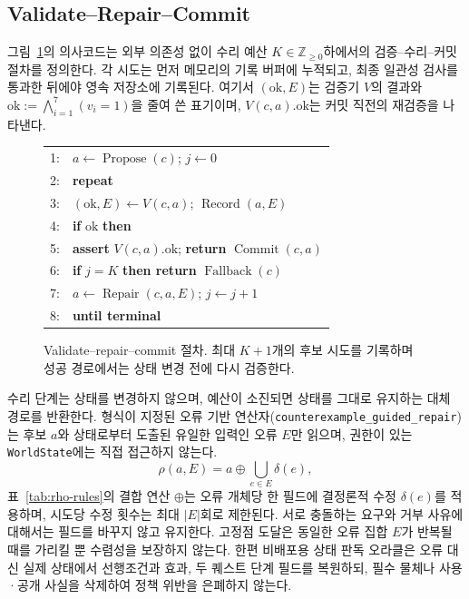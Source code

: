 \documentclass[journal]{IEEEtran}
\begin{document}
 


\subsection{Validate--Repair--Commit}\label{sec:repair}
그림~\ref{alg:commit}의 의사코드는 외부 의존성 없이 수리 예산 $K\in\mathbb{Z}_{\geq 0}$하에서의 검증--수리--커밋 절차를 정의한다. 각 시도는 먼저 메모리의 기록 버퍼에 누적되고, 최종 일관성 검사를 통과한 뒤에야 영속 저장소에 기록된다. 여기서 $(\mathrm{ok},E)$는 검증기 $V$의 결과와 $\mathrm{ok}:=\bigwedge_{i=1}^{7}(v_i=1)$을 줄여 쓴 표기이며, $V(c,a).\mathrm{ok}$는 커밋 직전의 재검증을 나타낸다.

\begin{figure}[!tbp]
\footnotesize
\begin{tabular}{@{}rl@{}}
1: & $a\leftarrow\operatorname{Propose}(c)$; $j\leftarrow0$ \\
2: & \textbf{repeat} \\
3: & \quad $(\mathrm{ok},E)\leftarrow V(c,a)$; $\operatorname{Record}(a,E)$ \\
4: & \quad \textbf{if} $\mathrm{ok}$ \textbf{then} \\
5: & \qquad \textbf{assert} $V(c,a).\mathrm{ok}$; \textbf{return} $\operatorname{Commit}(c,a)$ \\
6: & \quad \textbf{if} $j=K$ \textbf{then return} $\operatorname{Fallback}(c)$ \\
7: & \quad $a\leftarrow\operatorname{Repair}(c,a,E)$; $j\leftarrow j+1$ \\
8: & \textbf{until terminal}
\end{tabular}
\caption{Validate--repair--commit 절차. 최대 $K+1$개의 후보 시도를 기록하며 성공 경로에서는 상태 변경 전에 다시 검증한다.}
\label{alg:commit}
\end{figure}

수리 단계는 상태를 변경하지 않으며, 예산이 소진되면 상태를 그대로 유지하는 대체 경로를 반환한다. 형식이 지정된 오류 기반 연산자(\texttt{counterexample\_guided\_repair})는 후보 $a$와 상태로부터 도출된 유일한 입력인 오류 $E$만 읽으며, 권한이 있는 \texttt{WorldState}에는 직접 접근하지 않는다.
\begin{equation}
\rho(a,E)=a\oplus\bigcup_{e\in E}\delta(e),
\label{eq:rho}
\end{equation}
표~\ref{tab:rho-rules}의 결합 연산 $\oplus$는 오류 개체당 한 필드에 결정론적 수정 $\delta(e)$를 적용하며, 시도당 수정 횟수는 최대 $|E|$회로 제한된다. 서로 충돌하는 요구와 거부 사유에 대해서는 필드를 바꾸지 않고 유지한다. 고정점 도달은 동일한 오류 집합 $E$가 반복될 때를 가리킬 뿐 수렴성을 보장하지 않는다. 한편 비배포용 상태 판독 오라클은 오류 대신 실제 상태에서 선행조건과 효과, 두 퀘스트 단계 필드를 복원하되, 필수 물체나 사용·공개 사실을 삭제하여 정책 위반을 은폐하지 않는다.
\end{document}
